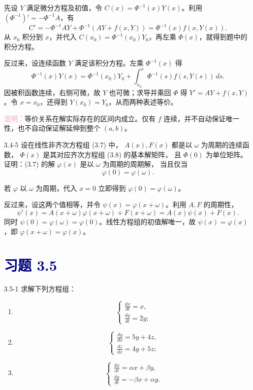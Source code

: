 \documentclass[UTF8,a4paper,11pt]{ctexart}
\newcommand{\note}[1]{\par\smallskip\noindent\textcolor{pink}{\bfseries 说明：}#1\par\smallskip}
\newcommand{\sect}[1]{\section*{\textcolor{navy}{习题 #1}}}
\begin{document}
\begin{solution}
先设 $Y$ 满足微分方程及初值，令 $C(x)=\Phi^{-1}(x)Y(x)$。利用
$(\Phi^{-1})'=-\Phi^{-1}A$，有
\[
C'=-\Phi^{-1}AY+\Phi^{-1}(AY+f(x,Y))
=\Phi^{-1}(x)f(x,Y(x)).
\]
从 $x_0$ 积分到 $x$，并代入 $C(x_0)=\Phi^{-1}(x_0)Y_0$，再左乘 $\Phi(x)$，就得到题中的积分方程。

反过来，设连续函数 $Y$ 满足该积分方程。左乘 $\Phi^{-1}(x)$ 得
\[
\Phi^{-1}(x)Y(x)=\Phi^{-1}(x_0)Y_0+
\int_{x_0}^x\Phi^{-1}(s)f(s,Y(s))\,ds.
\]
因被积函数连续，右侧可微，故 $Y$ 也可微；求导并乘回 $\Phi$ 得 $Y'=AY+f(x,Y)$。令 $x=x_0$，还得到 $Y(x_0)=Y_0$，从而两种表述等价。
\note{等价关系在解实际存在的区间内成立。仅有 $f$ 连续，并不自动保证唯一性，也不自动保证解延伸到整个 $(a,b)$。}
\end{solution}

\begin{problem}{3.4-5}
设在线性非齐次方程组 (3.7) 中，
  $A(x),F(x)$ 都是以 $\omega$ 为周期的连续函数，
  $\Phi(x)$ 是其对应齐次方程组 (3.8) 的基本解矩阵，
  且 $\Phi(0)$ 为单位矩阵。
  证明：(3.7) 的解 $\varphi(x)$ 是以 $\omega$ 为周期的周期解，
  当且仅当
  \[
    \varphi(0)=\varphi(\omega).
  \]
\end{problem}

\begin{solution}
若 $\varphi$ 以 $\omega$ 为周期，代入 $x=0$ 立即得到 $\varphi(0)=\varphi(\omega)$。

反过来，设这两个值相等，并令 $\psi(x)=\varphi(x+\omega)$。利用 $A,F$ 的周期性，
\[
\psi'(x)=A(x+\omega)\varphi(x+\omega)+F(x+\omega)
=A(x)\psi(x)+F(x).
\]
同时 $\psi(0)=\varphi(\omega)=\varphi(0)$。线性方程组的初值解唯一，故 $\psi(x)=\varphi(x)$，即 $\boxed{\varphi(x+\omega)=\varphi(x)}$。
\end{solution}

\sect{3.5}
\begin{problem}{3.5-1}
求解下列方程组：
  \begin{enumerate}[label=(\arabic*)]
    \item
    \[
    \begin{cases}
      \displaystyle \frac{dx}{dt}=x,\\[5pt]
      \displaystyle \frac{dy}{dt}=2y;
    \end{cases}
    \]

    \item
    \[
    \begin{cases}
      \displaystyle \frac{dy}{dx}=5y+4z,\\[5pt]
      \displaystyle \frac{dz}{dx}=4y+5z;
    \end{cases}
    \]

    \item
    \[
    \begin{cases}
      \displaystyle \frac{dx}{dt}=\alpha x+\beta y,\\[5pt]
      \displaystyle \frac{dy}{dt}=-\beta x+\alpha y.
    \end{cases}
    \]
  \end{enumerate}
\end{problem}
\end{document}
